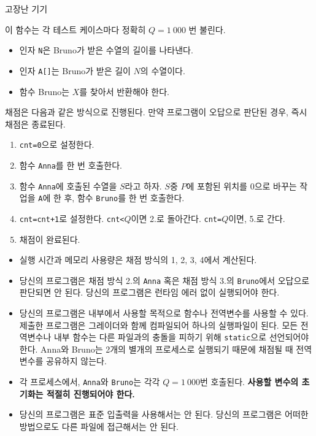 \begin{problem}{고장난 기기}
\begin{itemize}
		이 함수는 각 테스트 케이스마다 정확히 $Q = 1\ 000$ 번 불린다.
		\begin{itemize}
			\item 인자 \texttt{N}은 Bruno가 받은 수열의 길이를 나타낸다.
			\item 인자 \texttt{A[]}는 Bruno가 받은 길이 $N$의 수열이다.
			\item 함수 Bruno는 $X$를 찾아서 반환해야 한다.
		\end{itemize}
	\end{itemize}

	채점은 다음과 같은 방식으로 진행된다. 만약 프로그램이 오답으로 판단된 경우, 즉시 채점은 종료된다.
	
	\begin{enumerate}
		\item \texttt{cnt=0}으로 설정한다.
		\item 함수 \texttt{Anna}를 한 번 호출한다.
		\item 함수 \texttt{Anna}에 호출된 수열을 $S$라고 하자. $S$중 $P$에 포함된 위치를 0으로 바꾸는 작업을 \texttt{A}에 한 후, 함수 \texttt{Bruno}를 한 번 호출한다.
		\item \texttt{cnt=cnt+1}로 설정한다. \texttt{cnt<}$Q$이면 2.로 돌아간다. \texttt{cnt=}$Q$이면, 5.로 간다.
		\item 채점이 완료된다.
	\end{enumerate}
	
	\Notes
	
	\begin{itemize}
		\item 실행 시간과 메모리 사용량은 채점 방식의 1, 2, 3, 4에서 계산된다.
		\item 당신의 프로그램은 채점 방식 2.의 \texttt{Anna} 혹은 채점 방식 3.의 \texttt{Bruno}에서 오답으로 판단되면 안 된다. 당신의 프로그램은 런타임 에러 없이 실행되어야 한다.
		\item 당신의 프로그램은 내부에서 사용할 목적으로 함수나 전역변수를 사용할 수 있다. 제출한 프로그램은 그레이더와 함께 컴파일되어 하나의 실행파일이 된다. 모든 전역변수나 내부 함수는 다른 파일과의 충돌을 피하기 위해 \texttt{static}으로 선언되어야 한다. Anna와 Bruno는 2개의 별개의 프로세스로 실행되기 때문에 채점될 때 전역변수를 공유하지 않는다.
		\item 각 프로세스에서, \texttt{Anna}와 \texttt{Bruno}는 각각 $Q = 1\ 000$번 호출된다. \textbf{사용할 변수의 초기화는 적절히 진행되어야 한다.}
		\item 당신의 프로그램은 표준 입출력을 사용해서는 안 된다. 당신의 프로그램은 어떠한 방법으로도 다른 파일에 접근해서는 안 된다. 
	\end{itemize}
	

\end{problem}
